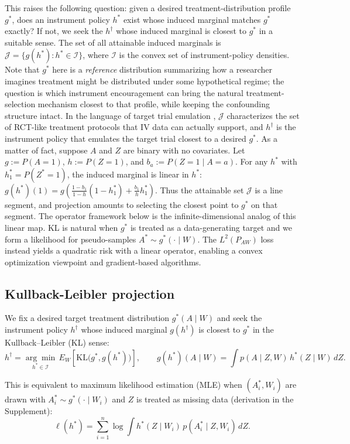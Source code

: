 \documentclass[12pt]{article}
\theoremstyle{thmstyleone}%
\theoremstyle{thmstyletwo}%
\theoremstyle{thmstylethree}%
\begin{document}
 {This raises the following question: given a desired treatment-distribution profile $g^*$, does an instrument policy $h^*$ exist whose induced marginal matches $g^*$ exactly? If not, we seek the $h^\dagger$ whose induced marginal is closest to $g^*$ in a suitable sense. The set of all attainable induced marginals is $\mathcal{J} = \{ g(h^*) : h^* \in \mathcal{I}\}$, where $\mathcal{I}$ is the convex set of instrument-policy densities. Note that $g^*$ here is a \emph{reference} distribution summarizing how a researcher imagines treatment might be distributed under some hypothetical regime; the question is which instrument encouragement can bring the natural treatment-selection mechanism closest to that profile, while keeping the confounding structure intact. In the language of target trial emulation \citep{hernan2016target}, $\mathcal{J}$ characterizes the set of RCT-like treatment protocols that IV data can actually support, and $h^\dagger$ is the instrument policy that emulates the target trial closest to a desired $g^*$.}
As a matter of fact, suppose $A$ and $Z$ are binary with no covariates. Let $g := P(A=1)$, $h := P(Z=1)$, and $b_a := P(Z=1 \mid A=a)$. For any $h^*$ with $h^*_1 = P(Z^*=1)$, the induced marginal is linear in $h^*$: $g(h^*)(1) = g\left(\frac{1-b_1}{1-h}(1-h^*_1) + \frac{b_1}{h} h^*_1\right)$. Thus the attainable set $\mathcal{J}$ is a line segment, and projection amounts to selecting the closest point to $g^*$ on that segment. The operator framework below is the infinite-dimensional analog of this linear map. KL is natural when $g^*$ is treated as a data-generating target and we form a likelihood for pseudo-samples $A^* \sim g^*(\cdot \mid W)$. The $L^2(P_{AW})$ loss instead yields a quadratic risk with a linear operator, enabling a convex optimization viewpoint and gradient-based algorithms.


\subsection{Kullback-Leibler projection}\label{EM}


 {We fix a desired target treatment distribution $g^*(A\mid W)$ and seek the instrument policy $h^\dagger$ whose induced marginal $g(h^\dagger)$ is closest to $g^*$ in the Kullback--Leibler (KL) sense:}
\[
h^\dagger
=
\underset{h^* \in \mathcal{I}}{\arg\min}\,
E_W \left[ \mathrm{KL}\bigl(g^*, g(h^*)\bigr)\right],
\qquad
g(h^*)(A\mid W) = \int p(A\mid Z,W)\,h^*(Z\mid W)\,dZ.
\]

This is equivalent to maximum likelihood estimation (MLE) when $(A_i^*,W_i)$ are drawn with $A_i^*\sim g^*(\cdot\mid W_i)$ and $Z$ is treated as missing data (derivation in the Supplement):
\[
\ell(h^*) = \sum_{i=1}^n \log \int h^*(Z\mid W_i)\,p(A_i^*\mid Z,W_i)\,dZ.
\]
\end{document}
